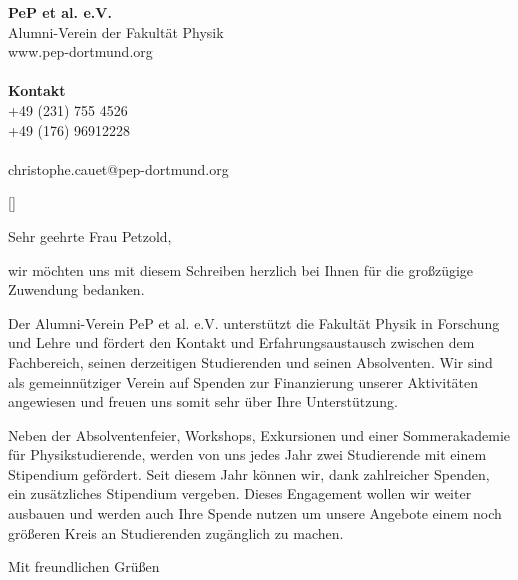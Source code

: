 \documentclass[fontsize=12pt, paper=a4, firsthead=false, locfield=wide, DIN, DIV14, parskip]{scrlttr2}
\begin{document}
\renewcommand*{\raggedsignature}{}

{\textbf{PeP et al. e.V.}\\\small{Alumni-Verein der Fakultät Physik\\www.pep-dortmund.org}\\\\ \textbf{Kontakt}\\+49 (231) 755 4526\\+49 (176) 96912228\\\\christophe.cauet@pep-dortmund.org}




[]{}
\opening{Sehr geehrte Frau Petzold,}
wir möchten uns mit diesem Schreiben herzlich bei Ihnen für die großzügige Zuwendung bedanken. 

Der Alumni-Verein PeP et al. e.V. unterstützt die Fakultät Physik in Forschung und Lehre und fördert den Kontakt und Erfahrungsaustausch zwischen dem Fachbereich, seinen derzeitigen Studierenden und seinen Absolventen. Wir sind als gemeinnütziger Verein auf Spenden zur Finanzierung unserer Aktivitäten angewiesen und freuen uns somit sehr über Ihre Unterstützung. 

Neben der Absolventenfeier, Workshops, Exkursionen und einer Sommerakademie für Physikstudierende, werden von uns jedes Jahr zwei Studierende mit einem Stipendium gefördert. Seit diesem Jahr können wir, dank zahlreicher Spenden, ein zusätzliches Stipendium vergeben. Dieses Engagement wollen wir weiter ausbauen und werden auch Ihre Spende nutzen um unsere Angebote einem noch größeren Kreis an Studierenden zugänglich zu machen.

\closing{Mit freundlichen Gr\"u{\ss}en}

\end{document}
